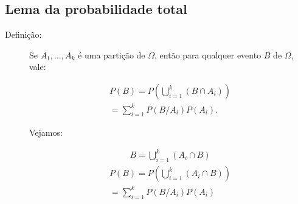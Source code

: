    \subsection{Lema da probabilidade total}
   \begin{description}
     \item [Definição:] Se $A_1,\ldots, A_k$ é uma partição de $\Omega$, então para qualquer evento $B$ de $\Omega$, vale:

       \begin{align}
         P(B)=P\left( \bigcup \limits^k_{i=1} \left(B \cap A_i \right) \right)\\ \nonumber
         = \sum^k_{i=1} P(B/A_i)P(A_i).
       \end{align}

       Vejamos: 

       \begin{align}
         B=  \bigcup \limits_{i=1}^k \left(A_i \cap B \right) 
       \end{align}
       \begin{align}
         P(B)=P \left(\bigcup \limits_{i=1}^k \left(A_i \cap B\right)\right) \\ \nonumber
         = \sum \limits_{i=1}^k P(B/A_i)P(A_i)
       \end{align}
   \end{description}
